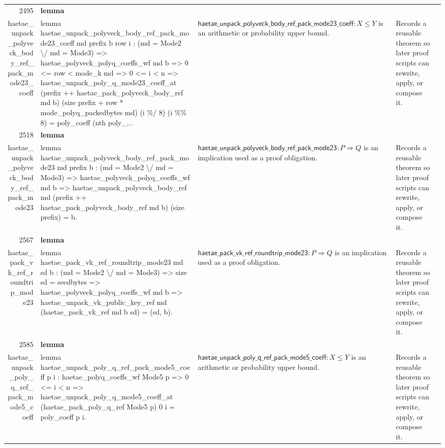 \documentclass[10pt]{article}
\newcommand{\ec}[1]{\begingroup\ttfamily\scriptsize #1\endgroup}
\begin{document}
\begin{longtable}{r L{0.17\textwidth} L{0.26\textwidth} L{0.27\textwidth} L{0.20\textwidth}}
2495 & \textbf{lemma}\\\ec{haetae\_unpack\_polyveck\_body\_ref\_pack\_mode23\_coeff} & \ec{lemma haetae\_unpack\_polyveck\_body\_ref\_pack\_mode23\_coeff md prefix b row i : (md = Mode2 \textbackslash{}/ md = Mode3) => haetae\_polyveck\_polyq\_coeffs\_wf md b => 0 <= row < mode\_k md => 0 <= i < n => haetae\_unpack\_poly\_q\_mode23\_coeff\_at (prefix ++ haetae\_pack\_polyveck\_body\_ref md b) (size prefix + row * mode\_polyq\_packedbytes md) (i \%/ 8) (i \%\% 8) = poly\_coeff (nth poly\_...} & \(\mathsf{haetae\_unpack\_polyveck\_body\_ref\_pack\_mode23\_coeff} : X \le Y\) is an arithmetic or probability upper bound. & Records a reusable theorem so later proof scripts can rewrite, apply, or compose it. \\
2518 & \textbf{lemma}\\\ec{haetae\_unpack\_polyveck\_body\_ref\_pack\_mode23} & \ec{lemma haetae\_unpack\_polyveck\_body\_ref\_pack\_mode23 md prefix b : (md = Mode2 \textbackslash{}/ md = Mode3) => haetae\_polyveck\_polyq\_coeffs\_wf md b => haetae\_unpack\_polyveck\_body\_ref md (prefix ++ haetae\_pack\_polyveck\_body\_ref md b) (size prefix) = b.} & \(\mathsf{haetae\_unpack\_polyveck\_body\_ref\_pack\_mode23} : P \Rightarrow Q\) is an implication used as a proof obligation. & Records a reusable theorem so later proof scripts can rewrite, apply, or compose it. \\
2567 & \textbf{lemma}\\\ec{haetae\_pack\_vk\_ref\_roundtrip\_mode23} & \ec{lemma haetae\_pack\_vk\_ref\_roundtrip\_mode23 md sd b : (md = Mode2 \textbackslash{}/ md = Mode3) => size sd = seedbytes => haetae\_polyveck\_polyq\_coeffs\_wf md b => haetae\_unpack\_vk\_public\_key\_ref md (haetae\_pack\_vk\_ref md b sd) = (sd, b).} & \(\mathsf{haetae\_pack\_vk\_ref\_roundtrip\_mode23} : P \Rightarrow Q\) is an implication used as a proof obligation. & Records a reusable theorem so later proof scripts can rewrite, apply, or compose it. \\
2585 & \textbf{lemma}\\\ec{haetae\_unpack\_poly\_q\_ref\_pack\_mode5\_coeff} & \ec{lemma haetae\_unpack\_poly\_q\_ref\_pack\_mode5\_coeff p i : haetae\_polyq\_coeffs\_wf Mode5 p => 0 <= i < n => haetae\_unpack\_poly\_q\_mode5\_coeff\_at (haetae\_pack\_poly\_q\_ref Mode5 p) 0 i = poly\_coeff p i.} & \(\mathsf{haetae\_unpack\_poly\_q\_ref\_pack\_mode5\_coeff} : X \le Y\) is an arithmetic or probability upper bound. & Records a reusable theorem so later proof scripts can rewrite, apply, or compose it. \\

\end{longtable}
\end{document}
